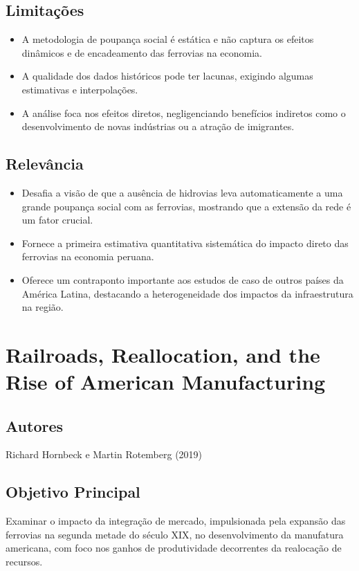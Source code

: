 \documentclass[12pt]{article}
\begin{document}
\subsection*{Limitações}
\begin{itemize}
    \item A metodologia de poupança social é estática e não captura os efeitos dinâmicos e de encadeamento das ferrovias na economia.
    \item A qualidade dos dados históricos pode ter lacunas, exigindo algumas estimativas e interpolações.
    \item A análise foca nos efeitos diretos, negligenciando benefícios indiretos como o desenvolvimento de novas indústrias ou a atração de imigrantes.
\end{itemize}

\subsection*{Relevância}
\begin{itemize}
    \item Desafia a visão de que a ausência de hidrovias leva automaticamente a uma grande poupança social com as ferrovias, mostrando que a extensão da rede é um fator crucial.
    \item Fornece a primeira estimativa quantitativa sistemática do impacto direto das ferrovias na economia peruana.
    \item Oferece um contraponto importante aos estudos de caso de outros países da América Latina, destacando a heterogeneidade dos impactos da infraestrutura na região.
\end{itemize}
\newpage

\section{Railroads, Reallocation, and the Rise of American Manufacturing}

\subsection*{Autores}
Richard Hornbeck e Martin Rotemberg (2019)

\subsection*{Objetivo Principal}
Examinar o impacto da integração de mercado, impulsionada pela expansão das ferrovias na segunda metade do século XIX, no desenvolvimento da manufatura americana, com foco nos ganhos de produtividade decorrentes da realocação de recursos.
\end{document}
